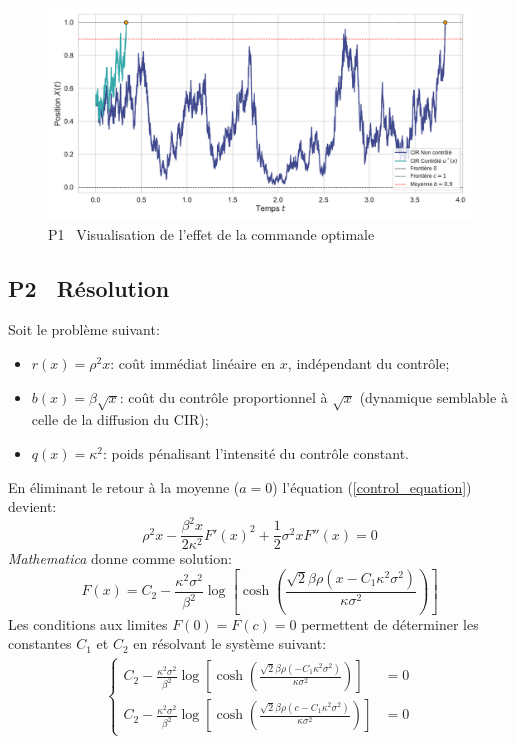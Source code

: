 \begin{figure}[htb]
    \centering
    \includegraphics[width=0.9\linewidth]{img/validation/P1/p1_control_simulation.pdf}
    \caption{P1 \textemdash~Visualisation de l'effet de la commande optimale}\label{fig:Simulation1}
\end{figure}\FloatBarrier\subsection{P2 \textemdash~Résolution}\label{p2}
Soit le problème suivant:
\begin{itemize}
    \item $r(x) = \rho^2x$: coût immédiat linéaire en $x$, indépendant du contrôle;
    \item $b(x) = \beta\sqrt{x}$: coût du contrôle proportionnel à $\sqrt{x}$ (dynamique semblable à celle de la diffusion du \acs{CIR});
    \item $q(x) = \kappa^2$: poids pénalisant l'intensité du contrôle constant.
\end{itemize}
En éliminant le retour à la moyenne ($a=0$) l'équation (\ref{control_equation}) devient:
\[
\rho^2x-\frac{\beta^2x}{2\kappa^2}{F'(x)}^2+\frac{1}{2}\sigma^2xF''(x)=0
\]
\textit{Mathematica} donne comme solution:
\begin{equation}
    F(x)=C_2-\frac{\kappa ^2 \sigma ^2 }{\beta ^2}\log \left[\cosh \left(\frac{\sqrt{2} \beta  \rho  \left(x-C_1 \kappa ^2 \sigma ^2\right)}{\kappa  \sigma ^2}\right)\right]
\end{equation}
Les conditions aux limites $F(0)=F(c)=0$ permettent de déterminer les constantes $C_1$ et $C_2$ en résolvant le système suivant:
\begin{align*}
\left\{\begin{aligned}
    C_2-\frac{\kappa ^2 \sigma ^2 }{\beta ^2}\log \left[\cosh \left(\frac{\sqrt{2} \beta  \rho  \left(-C_1 \kappa ^2 \sigma ^2\right)}{\kappa  \sigma ^2}\right)\right]&=0\\
    C_2-\frac{\kappa ^2 \sigma ^2 }{\beta ^2}\log \left[\cosh \left(\frac{\sqrt{2} \beta  \rho  \left(c-C_1 \kappa ^2 \sigma ^2\right)}{\kappa  \sigma ^2}\right)\right]&=0
\end{aligned}\right.
\end{align*}
